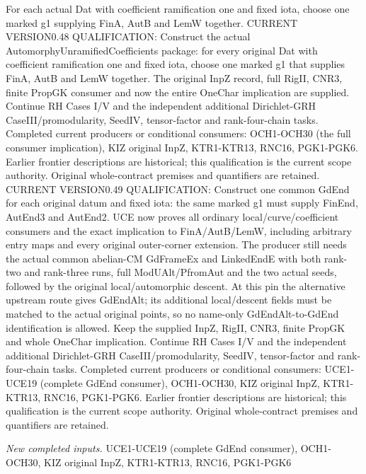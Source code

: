 \documentclass[11pt,a4paper]{article}
\numberwithin{equation}{section}
\theoremstyle{remark}\newtheorem{remark}[theorem]{Remark}
\begin{document}
For each actual Dat with coefficient ramification one and fixed iota, choose one marked g1 supplying FinA, AutB and LemW together. CURRENT VERSION0.48 QUALIFICATION: Construct the actual AutomorphyUnramifiedCoefficients package: for every original Dat with coefficient ramification one and fixed iota, choose one marked g1 that supplies FinA, AutB and LemW together. The original InpZ record, full RigII, CNR3, finite PropGK consumer and now the entire OneChar implication are supplied. Continue RH Cases I/V and the independent additional Dirichlet-GRH CaseIII/promodularity, SeedIV, tensor-factor and rank-four-chain tasks. Completed current producers or conditional consumers: OCH1-OCH30 (the full consumer implication), KIZ original InpZ, KTR1-KTR13, RNC16, PGK1-PGK6. Earlier frontier descriptions are historical; this qualification is the current scope authority. Original whole-contract premises and quantifiers are retained. CURRENT VERSION0.49 QUALIFICATION: Construct one common GdEnd for each original datum and fixed iota: the same marked g1 must supply FinEnd, AutEnd3 and AutEnd2. UCE now proves all ordinary local/curve/coefficient consumers and the exact implication to FinA/AutB/LemW, including arbitrary entry maps and every original outer-corner extension. The producer still needs the actual common abelian-CM GdFrameEx and LinkedEndE with both rank-two and rank-three runs, full ModUAlt/PfromAut and the two actual seeds, followed by the original local/automorphic descent. At this pin the alternative upstream route gives GdEndAlt; its additional local/descent fields must be matched to the actual original points, so no name-only GdEndAlt-to-GdEnd identification is allowed. Keep the supplied InpZ, RigII, CNR3, finite PropGK and whole OneChar implication. Continue RH Cases I/V and the independent additional Dirichlet-GRH CaseIII/promodularity, SeedIV, tensor-factor and rank-four-chain tasks. Completed current producers or conditional consumers: UCE1-UCE19 (complete GdEnd consumer), OCH1-OCH30, KIZ original InpZ, KTR1-KTR13, RNC16, PGK1-PGK6. Earlier frontier descriptions are historical; this qualification is the current scope authority. Original whole-contract premises and quantifiers are retained.

\emph{New completed inputs.} UCE1-UCE19 (complete GdEnd consumer), OCH1-OCH30, KIZ original InpZ, KTR1-KTR13, RNC16, PGK1-PGK6
\end{document}
